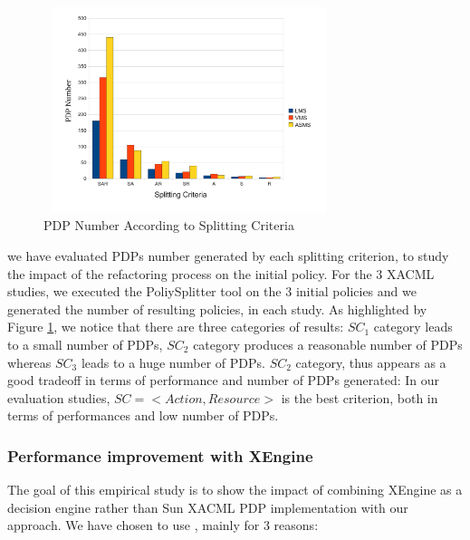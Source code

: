 \begin{figure}[!h]
  \centering
\includegraphics[width=8.5cm, height=6cm]{pdpnumber.pdf}
\begin{center}
\caption{PDP Number According to Splitting Criteria}
\label{pdpnumber}
\end{center}
\end{figure} 

we have evaluated PDPs number generated by each splitting criterion, to study the impact of the refactoring process on the initial policy. 
For the 3 XACML studies, we executed the PoliySplitter tool on the 3 initial policies and we generated the number of resulting policies, in each study. 
As highlighted by Figure \ref{pdpnumber}, we notice that there are three
 categories of results: $SC_{1}$ category leads to a small number of PDPs, $SC_{2}$ category produces a reasonable number of PDPs whereas $SC_{3}$ leads to a huge 
number of PDPs. $SC_{2}$ category, thus appears as a good tradeoff in terms of performance and number of 
PDPs generated: In our evaluation studies, $SC=<Action, Resource>$ is the best criterion, both in terms of performances and low number of PDPs.


\subsubsection{Performance improvement with XEngine}
The goal of this empirical study is to show the impact of combining XEngine as a decision engine rather than Sun XACML PDP implementation with our approach. 
We have chosen to use \cite{Xengine}, mainly for 3 reasons:

